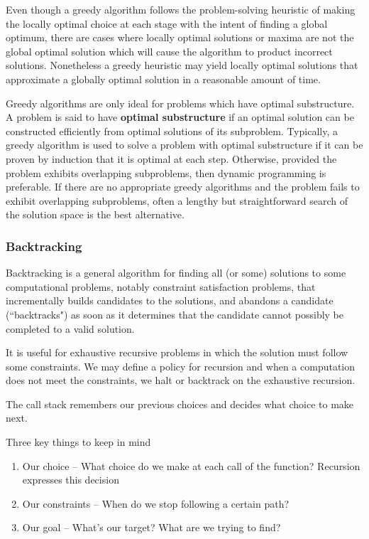 \documentclass{article}
\begin{document}
    Even though a greedy algorithm follows the problem-solving heuristic of making the locally optimal choice at each stage with the intent of finding a global optimum, there are cases where locally optimal solutions or maxima are not the global optimal solution which will cause the algorithm to product incorrect solutions. Nonetheless a greedy heuristic may yield locally optimal solutions that approximate a globally optimal solution in a reasonable amount of time.
    
    Greedy algorithms are only ideal for problems which have optimal substructure. A problem is said to have \textbf{optimal substructure} if an optimal solution can be constructed efficiently from optimal solutions of its subproblem. Typically, a greedy algorithm is used to solve a problem with optimal substructure if it can be proven by induction that it is optimal at each step. Otherwise, provided the problem exhibits overlapping subproblems, then dynamic programming is preferable. If there are no appropriate greedy algorithms and the problem fails to exhibit overlapping subproblems, often a lengthy but straightforward search of the solution space is the best alternative.
    
    \subsubsection{Backtracking}
    Backtracking is a general algorithm for finding all (or some) solutions to some computational problems, notably constraint satisfaction problems, that incrementally builds candidates to the solutions, and abandons a candidate (``backtracks") as soon as it determines that the candidate cannot possibly be completed to a valid solution. 
    
    It is useful for exhaustive recursive problems in which the solution must follow some constraints. We may define a policy for recursion and when a computation does not meet the constraints, we halt or backtrack on the exhaustive recursion.
    
    The call stack remembers our previous choices and decides what choice to make next.
    
    Three key things to keep in mind
    \begin{enumerate}
        \item Our choice -- What choice do we make at each call of the function? Recursion expresses this decision
        \item Our constraints -- When do we stop following a certain path?
        \item Our goal -- What's our target? What are we trying to find?
    \end{enumerate}
    
\end{document}
